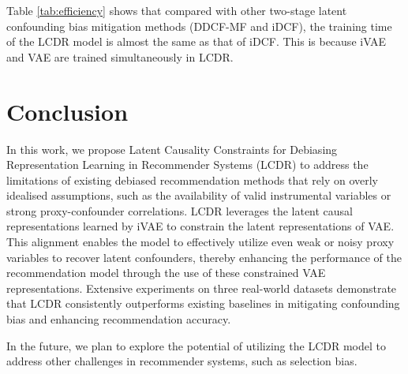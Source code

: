 \documentclass[sigconf]{acmart}
\begin{document}
Table \ref{tab:efficiency} shows that compared with other two-stage latent confounding bias mitigation methods (DDCF-MF and iDCF), the training time of the LCDR model is almost the same as that of iDCF. This is because iVAE and VAE are trained simultaneously in LCDR.


\section{Conclusion}



In this work, we propose Latent Causality Constraints for Debiasing Representation Learning in Recommender Systems (LCDR) to address the limitations of existing debiased recommendation methods that rely on overly idealised assumptions, such as the availability of valid instrumental variables or strong proxy-confounder correlations. LCDR leverages the latent causal representations learned by iVAE to constrain the latent representations of VAE. This alignment enables the model to effectively utilize even weak or noisy proxy variables to recover latent confounders, thereby enhancing the performance of the recommendation model through the use of these constrained VAE representations. Extensive experiments on three real-world datasets demonstrate that LCDR consistently outperforms existing baselines in mitigating confounding bias and enhancing recommendation accuracy.

In the future, we plan to explore the potential of utilizing the LCDR model to address other challenges in recommender systems, such as selection bias.





\balance

\end{document}
